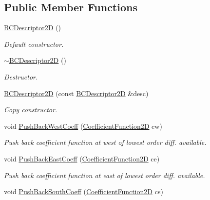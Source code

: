 \subsection*{Public Member Functions}
\begin{DoxyCompactItemize}
\item 
\hyperlink{classmtk_1_1BCDescriptor2D_abbc3af29202dbfef203f4cafd9566fd0}{B\+C\+Descriptor2\+D} ()
\begin{DoxyCompactList}\small\item\em Default constructor. \end{DoxyCompactList}\item 
\hyperlink{classmtk_1_1BCDescriptor2D_a8ca0aa779cf17f26f75e8b3cc98b6e30}{$\sim$\+B\+C\+Descriptor2\+D} ()
\begin{DoxyCompactList}\small\item\em Destructor. \end{DoxyCompactList}\item 
\hyperlink{classmtk_1_1BCDescriptor2D_ae8a93352a94efed52747b710e6ff7893}{B\+C\+Descriptor2\+D} (const \hyperlink{classmtk_1_1BCDescriptor2D}{B\+C\+Descriptor2\+D} \&desc)
\begin{DoxyCompactList}\small\item\em Copy constructor. \end{DoxyCompactList}\item 
void \hyperlink{classmtk_1_1BCDescriptor2D_a3da32ba89cfb15032bb1156394bad98c}{Push\+Back\+West\+Coeff} (\hyperlink{group__c07-mim__ops_ga0322dd5a158c1864242833ec224ee4c1}{Coefficient\+Function2\+D} cw)
\begin{DoxyCompactList}\small\item\em Push back coefficient function at west of lowest order diff. available. \end{DoxyCompactList}\item 
void \hyperlink{classmtk_1_1BCDescriptor2D_a27635428a6c36d1e305cafdc68271063}{Push\+Back\+East\+Coeff} (\hyperlink{group__c07-mim__ops_ga0322dd5a158c1864242833ec224ee4c1}{Coefficient\+Function2\+D} ce)
\begin{DoxyCompactList}\small\item\em Push back coefficient function at east of lowest order diff. available. \end{DoxyCompactList}\item 
void \hyperlink{classmtk_1_1BCDescriptor2D_a9eb891f14c68968a0113632fa5fea630}{Push\+Back\+South\+Coeff} (\hyperlink{group__c07-mim__ops_ga0322dd5a158c1864242833ec224ee4c1}{Coefficient\+Function2\+D} cs)

\end{DoxyCompactItemize}
